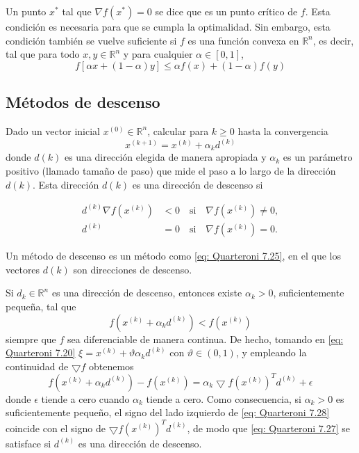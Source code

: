 Un punto $x^*$ tal que $\nabla f(x^*) = 0$ se dice que es un punto crítico de $f$. Esta condición es necesaria para que se cumpla la optimalidad. Sin embargo, esta condición también se vuelve suficiente si $f$ es una función convexa en $\mathbb{R}^n$, es decir, tal que para todo $x, y \in \mathbb{R}^n$ y para cualquier $\alpha \in [0, 1]$,
\begin{equation}
    \label{eq: Quarteroni 7.21}
    f[\alpha x + (1 - \alpha) y] \leq \alpha f(x) + (1 - \alpha)f(y)
\end{equation}

\subsection{Métodos de descenso}
Dado un vector inicial $x^{(0)} \in \mathbb{R}^n$, calcular para $k \geq 0$ hasta la convergencia
\begin{equation}
    \label{eq: Quarteroni 7.25}
    x^{(k + 1)} = x^{(k)} + \alpha_k d^{(k)}
\end{equation}
donde $d(k)$ es una dirección elegida de manera apropiada y $\alpha_k$ es un parámetro positivo (llamado tamaño de paso) que mide el paso a lo largo de la dirección $d(k)$. Esta dirección $d(k)$ es una dirección de descenso si

\begin{equation}
    \label{eq: Quarteroni 7.26}
    \begin{aligned}
        d^{(k)} \nabla f(x^{(k)}) &< 0 \quad \text{si} \quad \nabla f(x^{(k)}) \neq 0, \\
        d^{(k)} &= 0 \quad \text{si} \quad \nabla f(x^{(k)}) = 0.
    \end{aligned}
\end{equation}

Un método de descenso es un método como \ref{eq: Quarteroni 7.25}, en el que los vectores $d(k)$ son direcciones de descenso.

Si $d_k \in \mathbb{R}^n$ es una dirección de descenso, entonces existe $\alpha_k > 0$, suficientemente pequeña, tal que
\begin{equation}
    \label{eq: Quarteroni 7.27}
    f(x^{(k)} + \alpha_k d^{(k)}) < f(x^{(k)}) 
\end{equation}
siempre que $f$ sea diferenciable de manera continua. De hecho, tomando en \ref{eq: Quarteroni 7.20} $\xi = x^{(k)} + \vartheta \alpha_k d^{(k)}$ con $\vartheta \in (0, 1)$, y empleando la continuidad de $\bigtriangledown f$ obtenemos
\begin{equation}
    \label{eq: Quarteroni 7.28}
    f(x^{(k)} + \alpha_k d^{(k)}) - f(x^{(k)}) = \alpha_k \bigtriangledown f(x^{(k)})^T d^{(k)} + \epsilon
\end{equation}
donde $\epsilon$ tiende a cero cuando $\alpha_k$ tiende a cero. Como consecuencia, si $\alpha_k > 0$ es suficientemente pequeño, el signo del lado izquierdo de \ref{eq: Quarteroni 7.28} coincide con el signo de $\bigtriangledown f(x^{(k)})^T d^{(k)}$, de modo que \ref{eq: Quarteroni 7.27} se satisface si $d^{(k)}$ es una dirección de descenso. 

